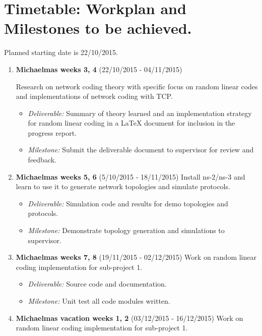 \documentclass[12pt,a4paper,twoside]{article}
\begin{document}
\section*{Timetable: Workplan and Milestones to be achieved.}

Planned starting date is 22/10/2015.

\begin{enumerate}

\item {\bf Michaelmas weeks 3, 4} (22/10/2015 - 04/11/2015)

Research on network coding theory with specific focus on random linear codes and implementations of network coding with TCP.
\begin{itemize}
  \item {\em Deliverable:} Summary of theory learned and an implementation strategy for random linear coding in a LaTeX document for inclusion in the progress report. 
  \item {\em Milestone:} Submit the deliverable document to supervisor for review and feedback.
\end{itemize}

\item {\bf Michaelmas weeks 5, 6} (5/10/2015 - 18/11/2015)
Install ns-2/ns-3 and learn to use it to generate network topologies and simulate protocols.

\begin{itemize}
  \item {\em Deliverable:} Simulation code and results for demo topologies and protocols.
  \item {\em Milestone:} Demonstrate topology generation and simulations to supervisor.
\end{itemize}

\item {\bf Michaelmas weeks 7, 8} (19/11/2015 - 02/12/2015)
Work on random linear coding implementation for sub-project 1.

\begin{itemize}
  \item {\em Deliverable:} Source code and documentation.
  \item {\em Milestone:} Unit test all code modules written.
\end{itemize}

\item {\bf Michaelmas vacation weeks 1, 2} (03/12/2015 - 16/12/2015)
Work on random linear coding implementation for sub-project 1.


\end{enumerate}
\end{document}
